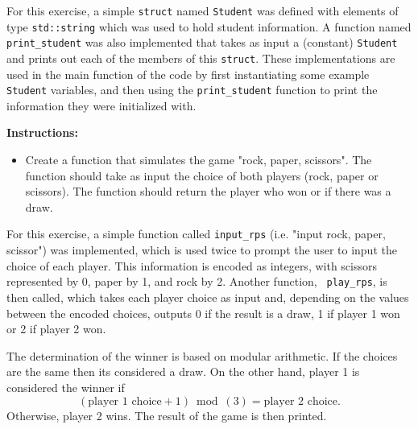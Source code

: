 \documentclass{article}
\newcounter{exercise}
\newenvironment{exr}[1]{%
    \refstepcounter{exercise}
    \begin{tcolorbox}[colback=blue!5!white, colframe=blue!75!black, title=Exercise \theexercise]
    \textbf{Instructions:} #1
    \end{tcolorbox}
    \vspace{1em}
}{}
\begin{document}
For this exercise, a simple \texttt{struct} named \texttt{Student} was defined with elements of type \texttt{std::string} which was used to hold student information. A function named \texttt{print\_student} was also implemented that takes as input a (constant) \texttt{Student} and prints out each of the members of this \texttt{struct}. These implementations are used in the main function of the code by first instantiating some example \texttt{Student} variables, and then using the \texttt{print\_student} function to print the information they were initialized with.



\begin{exr}{
    \begin{itemize}
        \item Create a function that simulates the game "rock, paper, scissors". The function should take as input the choice of both players (rock, paper or scissors). The function should return the player who won or if there was a draw.
    \end{itemize}
    }
\end{exr}

For this exercise, a simple function called \texttt{input\_rps} (i.e. "input rock, paper, scissor") was implemented, which is used twice to prompt the user to input the choice of each player. This information is encoded as integers, with scissors represented by 0, paper by 1, and rock by 2. Another function, \texttt{ play\_rps}, is then called, which takes each player choice as input and, depending on the values between the encoded choices, outputs 0 if the result is a draw, 1 if player 1 won or 2 if player 2 won. 

The determination of the winner is based on modular arithmetic. If the choices are the same then its considered a draw. On the other hand, player 1 is considered the winner if
\begin{equation*}
    (\text{player 1 choice} + 1) \bmod(3) = \text{player 2 choice} .
\end{equation*}
Otherwise, player 2 wins. The result of the game is then printed.


\end{document}
